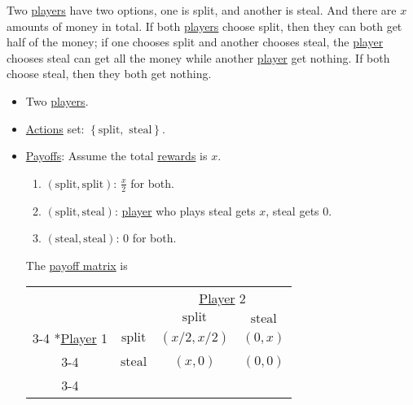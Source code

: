 \begin{eg}\label{eg:golden-ball}
	Two \hyperref[def:player]{players} have two options, one is split, and another is steal. And there are \(x\) amounts of money in total. If both \hyperref[def:player]{players}
	choose split, then they can both get half of the money; if one chooses split and another chooses steal, the \hyperref[def:player]{player} chooses steal can get all the money
	while another \hyperref[def:player]{player} get nothing. If both choose steal, then they both get nothing.
	\begin{itemize}
		\item Two \hyperref[def:player]{players}.
		\item \hyperref[def:strategy]{Actions} set: \(\left\{\text{split}, \text{ steal}\right\}\).
		\item \hyperref[def:reward]{Payoffs}: Assume the total \hyperref[def:reward]{rewards} is \(x\).
		      \begin{enumerate}
			      \item \((\text{split}, \text{split})\): \(\frac{x}{2}\) for both.
			      \item \((\text{split}, \text{steal})\): \hyperref[def:player]{player} who plays steal gets \(x\), steal gets \(0\).
			      \item \((\text{steal}, \text{steal})\): \(0\) for both.
		      \end{enumerate}
		      The \hyperref[def:payoff-matrix]{payoff matrix} is
		      \begin{table}[H]
			      \centering
			      \setlength{\extrarowheight}{2pt}
			      \begin{tabular}{cc|c|c|}
				                                                     & \multicolumn{1}{c}{} & \multicolumn{2}{c}{\hyperref[def:player]{Player} 2}                                      \\
				                                                     & \multicolumn{1}{c}{} & \multicolumn{1}{c}{$\text{split}$}                  & \multicolumn{1}{c}{$\text{steal}$} \\\cline{3-4}
				      \multirow{2}*{\hyperref[def:player]{Player} 1} & $\text{split}$       & $(x/2, x/2)$                                        & $(0, x)$                           \\\cline{3-4}
				                                                     & $\text{steal}$       & $(x, 0)$                                            & $(0, 0)$                           \\\cline{3-4}
			      \end{tabular}
		      \end{table}
	\end{itemize}


\end{eg}
